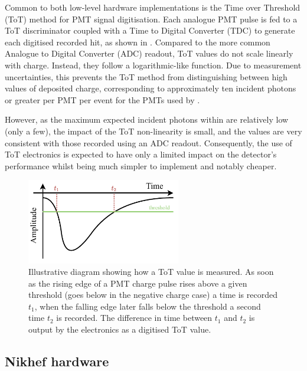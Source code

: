 Common to both low-level hardware implementations is the Time over Threshold (ToT) method for PMT
signal digitisation. Each analogue PMT pulse is fed to a ToT discriminator coupled with a Time to
Digital Converter (TDC) to generate each digitised recorded hit, as shown in .
Compared to the more common Analogue to Digital Converter (ADC) readout, ToT values do not scale
linearly with charge. Instead, they follow a logarithmic-like function. Due to measurement
uncertainties, this prevents the ToT method from distinguishing between high values of deposited
charge, corresponding to approximately ten incident photons or greater per PMT per event for the
PMTs used by \chipsfive. 

However, as the maximum expected incident photons within \chipsfive are relatively low (only a
few), the impact of the ToT non-linearity is small, and the values are very consistent with those
recorded using an ADC readout. Consequently, the use of ToT electronics is expected to have only a
limited impact on the detector's performance whilst being much simpler to implement and notably
cheaper.

\begin{figure} %
    \includegraphics[width=0.6\textwidth]{diagrams/5-daq/tot.pdf}
    \caption[Illustrative diagram showing how Time over Threshold is measured]
    {Illustrative diagram showing how a ToT value is measured. As soon as the rising edge of a PMT
        charge pulse rises above a given threshold (goes below in the negative charge case) a time
        is recorded $t_{1}$, when the falling edge later falls below the threshold a second time
        $t_{2}$ is recorded. The difference in time between $t_{1}$ and $t_{2}$ is output by the
        electronics as a digitised ToT value.}
    \label{fig:tot}
\end{figure}

\subsection{Nikhef hardware} %
\label{sec:daq_hard_Nikhed} %


